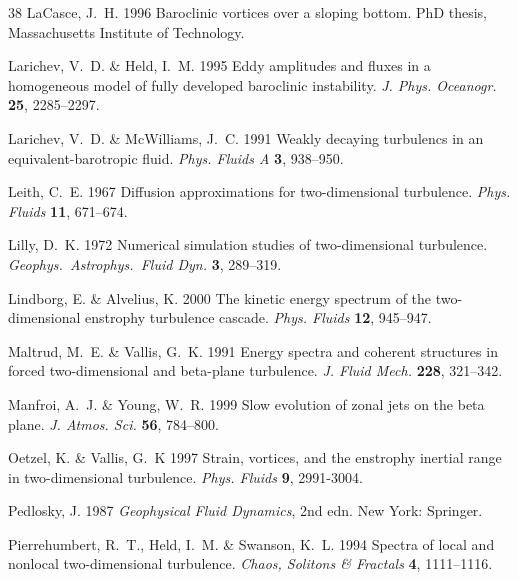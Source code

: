 \documentclass{jfm}
\begin{document}
\begin{thebibliography}{38}
{\sc LaCasce, J.~H.} 1996 Baroclinic vortices over a sloping bottom. PhD
  thesis, Massachusetts Institute of Technology.

{\sc Larichev, V.~D. \& Held, I.~M.} 1995 Eddy amplitudes and fluxes in a
  homogeneous model of fully developed baroclinic instability. {\em J. Phys.
  Oceanogr.\/} {\bf 25}, 2285--2297.

{\sc Larichev, V.~D. \& McWilliams, J.~C.} 1991 Weakly decaying turbulencs in
  an equivalent-barotropic fluid. {\em Phys. Fluids A\/} {\bf 3}, 938--950.

{\sc Leith, C.~E.} 1967 Diffusion approximations for two-dimensional
  turbulence. {\em Phys. Fluids\/} {\bf 11}, 671--674.

{\sc Lilly, D.~K.} 1972 Numerical simulation studies of two-dimensional
  turbulence. {\em Geophys.\ Astrophys.\ Fluid Dyn.\/} {\bf 3}, 289--319.
  
 {\sc Lindborg, E. \&
    Alvelius, K.} 2000 The kinetic energy spectrum of the
  two-dimensional enstrophy turbulence cascade. {\em Phys. Fluids\/}
  {\bf 12}, 945--947.
  
 {\sc Maltrud, M.~E. \&
    Vallis, G.~K.} 1991 Energy spectra and coherent structures in
  forced two-dimensional and beta-plane turbulence. {\em J. Fluid
    Mech.\/} {\bf 228}, 321--342.

 {\sc Manfroi, A.~J. \&
    Young, W.~R.} 1999 Slow evolution of zonal jets on the beta plane.
  {\em J. Atmos. Sci.\/} {\bf 56}, 784--800.
  
 {\sc Oetzel, K. \& Vallis,
   G.~K} 1997 Strain, vortices, and the enstrophy inertial range in
  two-dimensional turbulence. {\em Phys.  Fluids\/} {\bf 9},
  2991-3004.


{\sc Pedlosky, J.} 1987 {\em Geophysical Fluid Dynamics\/}, 2nd edn. New York:
  Springer.

{\sc Pierrehumbert, R.~T., Held, I.~M. \& Swanson, K.~L.} 1994 Spectra of local
  and nonlocal two-dimensional turbulence. {\em Chaos, Solitons \& Fractals\/}
  {\bf 4}, 1111--1116.


\end{thebibliography}
\end{document}
